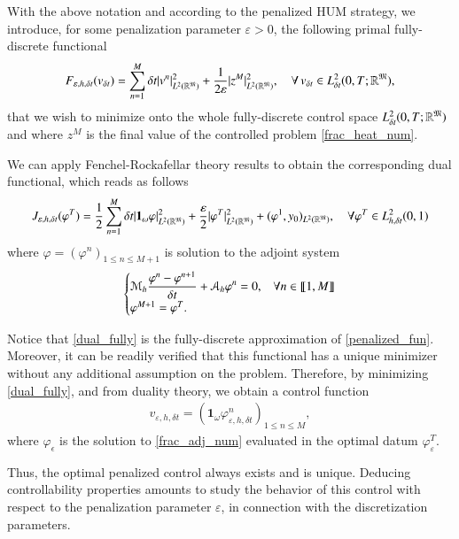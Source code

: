 With the above notation and according to the penalized HUM strategy, we introduce, for some penalization parameter $\varepsilon>0$, the following primal fully-discrete functional 
%
\begin{align*}
F_{\varepsilon,h,\delta t}(v_{\delta t})=\sum_{n=1}^{M}\delta t |v^n|^2_{L^2(\mathbb{R}^{\mathfrak{M}})}+\frac{1}{2\varepsilon}|z^M|^2_{L^2(\mathbb{R}^{\mathfrak{M}})}, \quad \forall \, v_{\delta t}\in L_{\delta t}^2(0,T;\mathbb R^{\mathfrak{M}}),
\end{align*}
%
that we wish to minimize onto the whole fully-discrete control space $L_{\delta t}^2(0,T;\mathbb R^{\mathfrak{M}})$ and where $z^M$ is the final value of the controlled problem \eqref{frac_heat_num}. 

We can apply Fenchel-Rockafellar theory results to obtain the corresponding dual functional, which reads as follows
%
\begin{align}\label{dual_fully}
	J_{\varepsilon,h,\delta t}(\varphi^T)=\frac{1}{2}\sum_{n=1}^{M}\delta t|\mathbf 1_\omega\varphi|^2_{L^2(\mathbb{R}^{\mathfrak{M}})}+\frac{\varepsilon}{2}|\varphi^T|^2_{L^2(\mathbb{R}^{\mathfrak{M}})}+(\varphi^1,y_0)_{L^2(\mathbb{R}^{\mathfrak{M}})}, \quad \forall \varphi^T\in L_{h,\delta t}^2(0,1)
\end{align}
%
where $\varphi=(\varphi^n)_{1\leq n\leq M+1}$ is solution to the adjoint system
%
\begin{align}\label{frac_adj_num}
	\begin{cases}
		\displaystyle\mathcal M_h \frac{\varphi^n-\varphi^{n+1}}{\delta t}+\mathcal A_h \varphi^n=0, & \forall n\in\llbracket 1,M\rrbracket
		\\
		\varphi^{M+1}=\varphi^T. 
	\end{cases}
\end{align}

Notice that \eqref{dual_fully} is the fully-discrete approximation of \eqref{penalized_fun}. Moreover, it can be readily verified that this functional has a unique minimizer without any additional assumption on the problem. Therefore, by minimizing  \eqref{dual_fully}, and from duality theory, we obtain a control function 
\begin{align*}
	v_{\varepsilon,h,\delta t}=\left(\mathbf{1}_\omega\varphi_{\varepsilon,h,\delta t}^n\right)_{1\leq n\leq M},
\end{align*}
where $\varphi_\epsilon$ is the solution to \eqref{frac_adj_num} evaluated in the optimal datum $\varphi_\varepsilon^T$. 

Thus, the optimal penalized control always exists and is unique. Deducing controllability properties amounts to study the behavior of this control with respect to the penalization parameter $\varepsilon$, in connection with the discretization parameters.  

